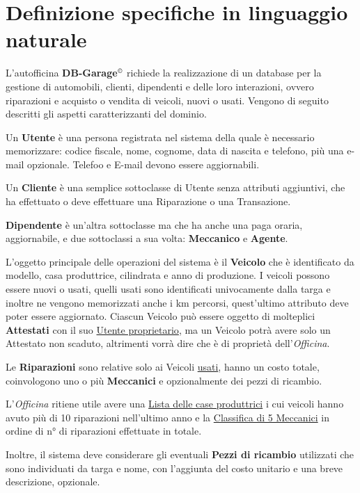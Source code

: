\documentclass[a4paper,12pt]{report}
\begin{document}
\section{Definizione specifiche in linguaggio naturale}
L'autofficina \textbf{DB-Garage}$^{\copyright}$ richiede la realizzazione di un database per la gestione di automobili,
%
clienti, dipendenti e delle loro interazioni, ovvero riparazioni e acquisto o vendita di veicoli, nuovi o usati. Vengono di seguito 
%
descritti gli aspetti caratterizzanti del dominio.

Un \textbf{Utente} è una persona registrata nel sistema della quale è necessario memorizzare: codice fiscale, nome, cognome,
%
data di nascita e telefono, più una e-mail opzionale. Telefoo e E-mail devono essere aggiornabili.

Un \textbf{Cliente} è una semplice sottoclasse di Utente senza attributi aggiuntivi, che ha effettuato o deve effettuare 
%
una Riparazione o una Transazione.

\textbf{Dipendente} è un'altra sottoclasse ma che ha anche una paga oraria, aggiornabile, e due sottoclassi a sua volta: \textbf{Meccanico} e \textbf{Agente}.

L'oggetto principale delle operazioni del sistema è il \textbf{Veicolo} che è identificato da modello, casa produttrice, cilindrata e anno di produzione.
%
I veicoli possono essere nuovi o usati, quelli usati sono identificati univocamente dalla targa e inoltre ne vengono 
%
memorizzati anche i km percorsi, quest'ultimo attributo deve poter essere aggiornato.
%
Ciascun Veicolo può essere oggetto di molteplici \textbf{Attestati} con il suo \underline{Utente proprietario}, 
%
ma un Veicolo potrà avere solo un Attestato non scaduto, altrimenti vorrà dire che è di proprietà dell'\textit{Officina}.

Le \textbf{Riparazioni} sono relative solo ai Veicoli \underline{usati}, hanno un costo totale, coinvologono uno o più 
%
\textbf{Meccanici} e opzionalmente dei pezzi di ricambio.

L'\textit{Officina} ritiene utile avere una \underline{Lista delle case produttrici} i cui veicoli hanno avuto più di 10 riparazioni
%
nell'ultimo anno e la \underline{Classifica di 5 Meccanici} in ordine di n° di riparazioni effettuate in totale.

Inoltre, il sistema deve considerare gli eventuali \textbf{Pezzi di ricambio} utilizzati che sono individuati da 
%
targa e nome, con l'aggiunta del costo unitario e una breve descrizione, opzionale.
\end{document}
